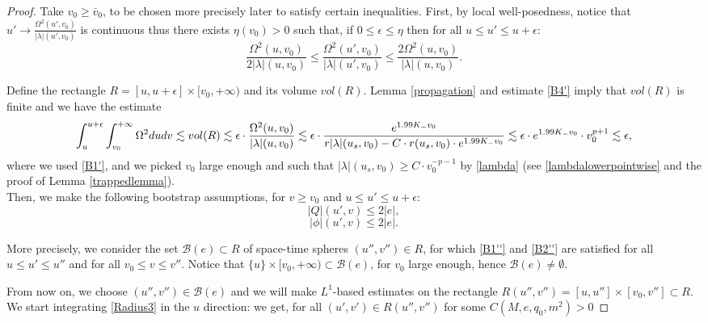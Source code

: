 \documentclass[10pt,a4paper]{article}
\theoremstyle{plain}
\theoremstyle{remark}
\theoremstyle{definition}
\theoremstyle{plain}
\theoremstyle{remark}
\theoremstyle{definition}
\numberwithin{equation}{section}
\begin{document}
\begin{proof} Take $v_0 \geq \breve{v_0}$, to be chosen more precisely later to satisfy certain inequalities. First, by local well-posedness, notice that $u' \rightarrow \frac{\Omega^2(u',v_0)}{|\lambda|(u',v_0)}$ is continuous thus there exists $\eta(v_0)>0$ such that, if $0 \leq \epsilon \leq \eta$ then for all $u \leq u' \leq u+\epsilon$: $$\frac{\Omega^2(u,v_0)}{2|\lambda|(u,v_0)} \leq \frac{\Omega^2(u',v_0)}{|\lambda|(u',v_0)} \leq \frac{2\Omega^2(u,v_0)}{|\lambda|(u,v_0)}. $$
	
	Define the rectangle $R= [u,u+\epsilon] \times [v_0,+\infty)$ and its volume $vol(R)$. Lemma \ref{propagation} and estimate \eqref{B4'} imply that $vol(R)$ is finite and we have the estimate $$\int_{u}^{u+\epsilon} \int_{v_0}^{+\infty} \Omega^2 du dv \lesssim vol(R) \lesssim \epsilon \cdot \frac{\Omega^2(u,v_0)}{|\lambda|(u,v_0)} \lesssim \epsilon \cdot \frac{ e^{1.99 K_- v_0}}{r|\lambda|(u_s,v_0) -C \cdot r(u_s,v_0) \cdot e^{1.99 K_-  v_0} }  \lesssim   \epsilon \cdot  e^{1.99 K_- v_0} \cdot v_0^{p+1}\color{black} \lesssim \epsilon,$$ where we used \eqref{B1'}, and we picked $v_0$ large enough and such that $|\lambda|(u_s,v_0) \geq C \cdot v_0^{-p-1}$ by \eqref{lambda} (see \eqref{lambdalowerpointwise} and the proof of Lemma \ref{trappedlemma}).\color{black} \\	Then, we make the following bootstrap assumptions, for $v\geq v_0$ and $u \leq u' \leq u+ \epsilon$:  \begin{equation} \label{B1''}
	|Q|(u',v) \leq 2|e|,
	\end{equation}
	\begin{equation} \label{B2''}
	|\phi|(u',v) \leq 2|e|.
	\end{equation}
	
	More precisely, we consider the set $\mathcal{B}(e) \subset R$ of space-time spheres $(u'',v'') \in R$, for which \eqref{B1''} and \eqref{B2''} are satisfied for all $u \leq u' \leq u''$ and for all $v_0 \leq v \leq v''$. Notice that $ \{u\} \times [v_0,+\infty) \subset \mathcal{B}(e)$, for $v_0$ large enough, hence $\mathcal{B}(e) \neq \emptyset$.
	
	From now on, we choose $(u'',v'') \in \mathcal{B}(e) $ and we will make $L^1$-based estimates on the rectangle $R(u'',v'')= [u,u''] \times [v_0,v''] \subset R$. We start integrating \eqref{Radius3} in the $u$ direction: we get, for all $(u',v') \in R(u'',v'')$ for some $C(M,e,q_0,m^2)>0$
	

\end{proof}
\end{document}
